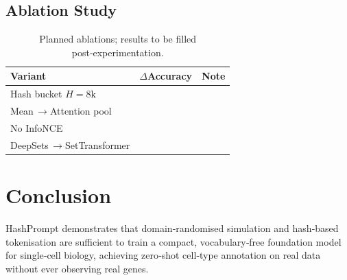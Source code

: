 \documentclass{article}
\begin{document}
\subsection{Ablation Study}\label{sec:ablation}
\begin{table}[h]
	\centering
	\begin{tabular}{lcc}
		\toprule
		\textbf{Variant} & \(\Delta\)Accuracy & Note\\
		\midrule
		Hash bucket \(H=8\mathrm{k}\) &  & \\
		Mean\,\(\rightarrow\)Attention pool &  & \\
		No InfoNCE &  & \\
		DeepSets\,\(\rightarrow\)SetTransformer &  & \\
		\bottomrule
	\end{tabular}
	\caption{Planned ablations; results to be filled post‑experimentation.}
\end{table}

\section{Conclusion}
HashPrompt demonstrates that domain‑randomised simulation and hash‑based tokenisation are sufficient to train a compact, vocabulary‑free foundation model for single‑cell biology, achieving zero‑shot cell‑type annotation on real data without ever observing real genes.




\end{document}
